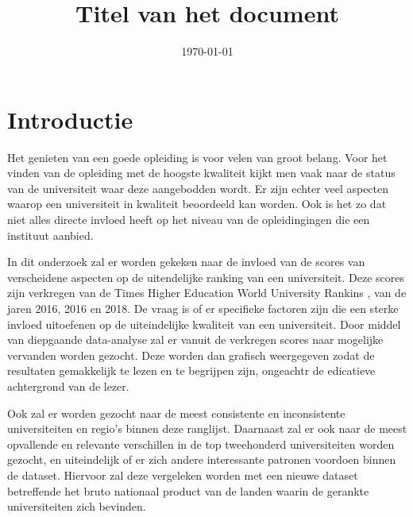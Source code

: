 \documentclass{uva-inf-article}
\title{Titel van het document}
\date{\today}
\begin{document}
\maketitle




\section{Introductie}
Het genieten van een goede opleiding is voor velen van groot belang. Voor het vinden van de opleiding met de hoogste kwaliteit kijkt men vaak naar de status van de universiteit waar deze aangebodden wordt. Er zijn echter veel aspecten waarop een universiteit in kwaliteit beoordeeld kan worden. Ook is het zo dat niet alles directe invloed heeft op het niveau van de opleidingingen die een instituut aanbied.

In dit onderzoek zal er worden gekeken naar de invloed van de scores van verscheidene aspecten op de uitendelijke ranking van een universiteit. Deze scores zijn verkregen van de Times Higher Education World University Rankins \cite{Times}, van de jaren 2016, 2016 en 2018. De vraag is of er specifieke factoren zijn die een sterke invloed uitoefenen op de uiteindelijke kwaliteit van een universiteit. Door middel van diepgaande data-analyse zal er vanuit de verkregen scores naar mogelijke vervanden worden gezocht. Deze worden dan grafisch weergegeven zodat de resultaten gemakkelijk te lezen en te begrijpen zijn, ongeachtr de edicatieve achtergrond van de lezer.


Ook zal er worden gezocht naar de meest consistente en inconsistente universiteiten en regio's binnen deze ranglijst. Daarnaast zal er ook naar de meest opvallende en relevante verschillen in de top tweehonderd universiteiten worden gezocht, en uiteindelijk of er zich andere interessante patronen voordoen binnen de dataset. Hiervoor zal deze vergeleken worden met een nieuwe dataset betreffende het bruto nationaal product van de landen waarin de gerankte universiteiten zich bevinden.
\end{document}
